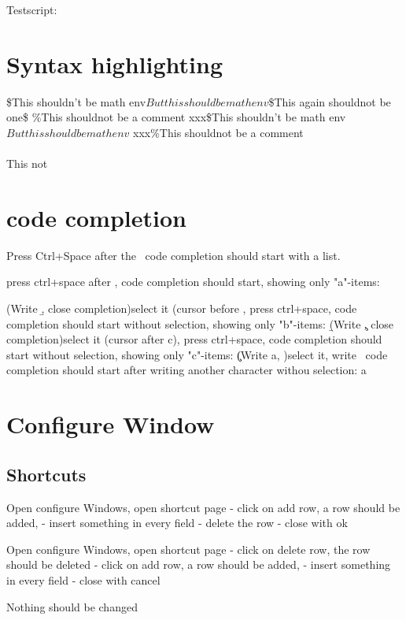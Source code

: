 Testscript:

\section{Syntax highlighting}
\$This shouldn't be math env$But this should be math env$\$This again shouldnot be one\$
\%This shouldnot be a comment%
xxx\$This shouldn't be math env$But this should be math env$
xxx\%This shouldnot be a comment%
\thisShouldBeACommand\\\ThisToo\\This not

\section{code completion}

Press Ctrl+Space after the \, code completion should start with a list. 
\

press ctrl+space after \a, code completion should start, showing only "a"-items:
\a


(Write \b, close completion)select it (cursor before \), press ctrl+space, code completion should start without selection, showing only "b"-items:
\b

(Write \c, close completion)select it (cursor after c), press ctrl+space, code completion should start without selection, showing only "c"-items:
\c

(Write a, )select it, write \, code completion should start after writing another character withou selection:
a

\section{Configure Window}
\subsection{Shortcuts}
Open configure Windows, open shortcut page
   - click on add row, a row should be added, 
   - insert something in every field
   - delete the row
   - close with ok

Open configure Windows, open shortcut page
   - click on delete row, the row should be deleted
   - click on add row, a row should be added, 
   - insert something in every field
   - close with cancel
   
Nothing should be changed

